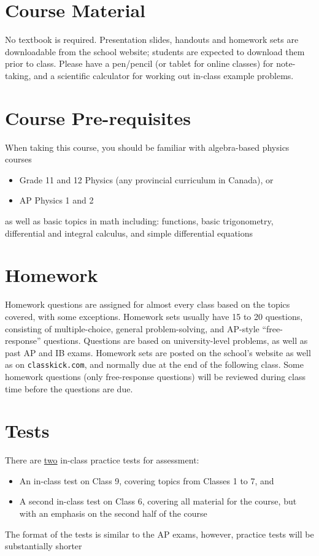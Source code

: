 \documentclass{../../oss-handout}
\begin{document}
\section{Course Material}
No textbook is required. Presentation slides, handouts and homework sets are
downloadable from the school website; students are expected to download them
prior to class. Please have a pen/pencil (or tablet for online classes) for
note-taking, and a scientific calculator for working out in-class example
problems.


\section{Course Pre-requisites}
When taking this course, you should be familiar with algebra-based physics
courses 
\begin{itemize}[nosep]
\item Grade 11 and 12 Physics (any provincial curriculum in Canada), or
\item AP Physics 1 and 2
\end{itemize}
as well as basic topics in math including: functions, basic trigonometry,
differential and integral calculus, and simple differential equations



\section{Homework}
Homework questions are assigned for almost every class based on the topics
covered, with some exceptions. Homework sets usually have 15 to 20 questions,
consisting of multiple-choice, general problem-solving, and AP-style
``free-response'' questions. Questions are based on university-level problems,
as well as past AP and IB exams. Homework sets are posted on the school's
website as well as on \texttt{classkick.com}, and normally due at the end of
the following class. Some homework questions (only free-response questions)
will be reviewed during class time before the questions are due.


\section{Tests}
There are \underline{two} in-class practice tests for assessment:
\begin{itemize}[nosep]
\item An in-class test on Class 9, covering topics from Classes 1 to 7, and
\item A second in-class test on Class 6, covering all
  material for the course, but with an emphasis on the second half of the course
\end{itemize}
The format of the tests is similar to the AP exams, however, practice tests
will be substantially shorter
\end{document}
